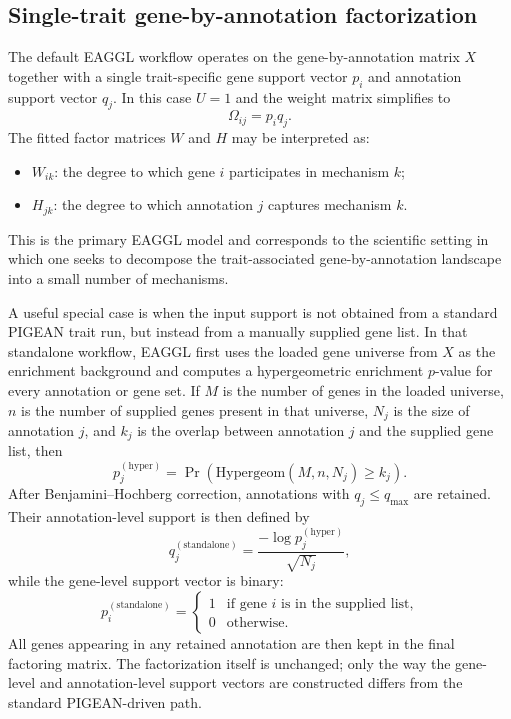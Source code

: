 \documentclass[11pt]{article}
\begin{document}
\subsection{Single-trait gene-by-annotation factorization}

The default EAGGL workflow operates on the gene-by-annotation matrix $X$ together with a single trait-specific gene support vector $p_i$ and annotation support vector $q_j$. In this case $U=1$ and the weight matrix simplifies to
\begin{equation}
\Omega_{ij} = p_i q_j.
\label{eq:eaggl_single_trait_weights}
\end{equation}
The fitted factor matrices $W$ and $H$ may be interpreted as:
\begin{itemize}
\item $W_{ik}$: the degree to which gene $i$ participates in mechanism $k$;
\item $H_{jk}$: the degree to which annotation $j$ captures mechanism $k$.
\end{itemize}
This is the primary EAGGL model and corresponds to the scientific setting in which one seeks to decompose the trait-associated gene-by-annotation landscape into a small number of mechanisms.

A useful special case is when the input support is not obtained from a standard PIGEAN trait run, but instead from a manually supplied gene list. In that standalone workflow, EAGGL first uses the loaded gene universe from $X$ as the enrichment background and computes a hypergeometric enrichment $p$-value for every annotation or gene set. If $M$ is the number of genes in the loaded universe, $n$ is the number of supplied genes present in that universe, $N_j$ is the size of annotation $j$, and $k_j$ is the overlap between annotation $j$ and the supplied gene list, then
\begin{equation}
p_j^{(\mathrm{hyper})}
=
\Pr\!\left(
\mathrm{Hypergeom}(M, n, N_j) \ge k_j
\right).
\label{eq:eaggl_gene_list_hypergeom}
\end{equation}
After Benjamini--Hochberg correction, annotations with $q_j \le q_{\max}$ are retained. Their annotation-level support is then defined by
\begin{equation}
q_j^{(\mathrm{standalone})}
=
\frac{-\log p_j^{(\mathrm{hyper})}}{\sqrt{N_j}},
\label{eq:eaggl_gene_list_weights}
\end{equation}
while the gene-level support vector is binary:
\[
p_i^{(\mathrm{standalone})}
=
\begin{cases}
1 & \text{if gene } i \text{ is in the supplied list,} \\
0 & \text{otherwise.}
\end{cases}
\]
All genes appearing in any retained annotation are then kept in the final factoring matrix. The factorization itself is unchanged; only the way the gene-level and annotation-level support vectors are constructed differs from the standard PIGEAN-driven path.
\end{document}
